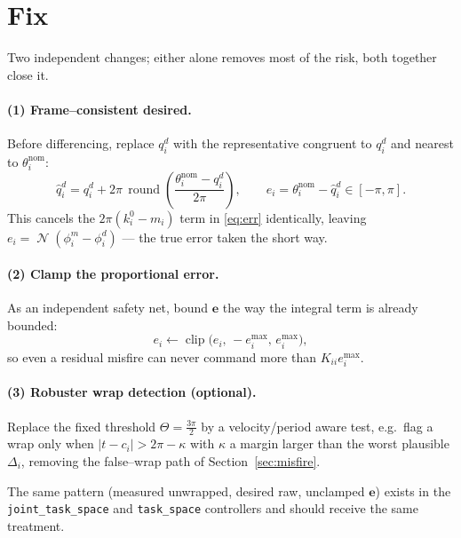 \documentclass[11pt]{article}
\newcommand{\round}{\operatorname{round}}
\newcommand{\clip}{\operatorname{clip}}
\DeclareMathOperator{\Nrm}{\mathcal{N}}
\begin{document}
\section{Fix}

Two independent changes; either alone removes most of the risk, both
together close it.

\paragraph{(1) Frame--consistent desired.}
Before differencing, replace $q^d_i$ with the representative congruent to
$q^d_i$ and nearest to $\theta^{\mathrm{nom}}_i$:
\begin{equation}
\hat q^d_i = q^d_i + 2\pi\,\round\!\left(\frac{\theta^{\mathrm{nom}}_i-q^d_i}{2\pi}\right),
\qquad
e_i=\theta^{\mathrm{nom}}_i-\hat q^d_i\in[-\pi,\pi].
\end{equation}
This cancels the $2\pi(k_i^0-m_i)$ term in \eqref{eq:err} identically,
leaving $e_i=\Nrm(\phi^m_i-\phi^d_i)$ --- the true error taken the short way.

\paragraph{(2) Clamp the proportional error.}
As an independent safety net, bound $\bm e$ the way the integral term is
already bounded:
\begin{equation}
e_i \leftarrow \clip\big(e_i,\,-e^{\max}_i,\,e^{\max}_i\big),
\end{equation}
so even a residual misfire can never command more than $K_{ii}e^{\max}_i$.

\paragraph{(3) Robuster wrap detection (optional).}
Replace the fixed threshold $\Theta=\tfrac{3\pi}{2}$ by a velocity/period
aware test, e.g.\ flag a wrap only when $|t-c_i|>2\pi-\kappa$ with
$\kappa$ a margin larger than the worst plausible $\Delta_i$, removing the
false--wrap path of Section~\ref{sec:misfire}.

The same pattern (measured unwrapped, desired raw, unclamped $\bm e$)
exists in the \texttt{joint\_task\_space} and \texttt{task\_space}
controllers and should receive the same treatment.
\end{document}
